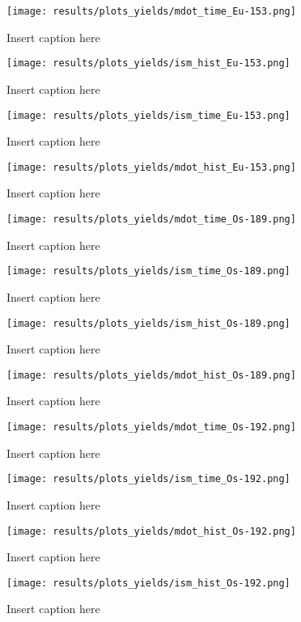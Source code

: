 \begin{figure}
  \centering
  \texttt{[image: results/plots\_yields/mdot\_time\_Eu-153.png]}
  \caption{Insert caption here}
\end{figure}
\begin{figure}
  \centering
  \texttt{[image: results/plots\_yields/ism\_hist\_Eu-153.png]}
  \caption{Insert caption here}
\end{figure}
\begin{figure}
  \centering
  \texttt{[image: results/plots\_yields/ism\_time\_Eu-153.png]}
  \caption{Insert caption here}
\end{figure}
\begin{figure}
  \centering
  \texttt{[image: results/plots\_yields/mdot\_hist\_Eu-153.png]}
  \caption{Insert caption here}
\end{figure}

\begin{figure}
  \centering
  \texttt{[image: results/plots\_yields/mdot\_time\_Os-189.png]}
  \caption{Insert caption here}
\end{figure}
\begin{figure}
  \centering
  \texttt{[image: results/plots\_yields/ism\_time\_Os-189.png]}
  \caption{Insert caption here}
\end{figure}
\begin{figure}
  \centering
  \texttt{[image: results/plots\_yields/ism\_hist\_Os-189.png]}
  \caption{Insert caption here}
\end{figure}
\begin{figure}
  \centering
  \texttt{[image: results/plots\_yields/mdot\_hist\_Os-189.png]}
  \caption{Insert caption here}
\end{figure}

\begin{figure}
  \centering
  \texttt{[image: results/plots\_yields/mdot\_time\_Os-192.png]}
  \caption{Insert caption here}
\end{figure}
\begin{figure}
  \centering
  \texttt{[image: results/plots\_yields/ism\_time\_Os-192.png]}
  \caption{Insert caption here}
\end{figure}
\begin{figure}
  \centering
  \texttt{[image: results/plots\_yields/mdot\_hist\_Os-192.png]}
  \caption{Insert caption here}
\end{figure}
\begin{figure}
  \centering
  \texttt{[image: results/plots\_yields/ism\_hist\_Os-192.png]}
  \caption{Insert caption here}
\end{figure}

